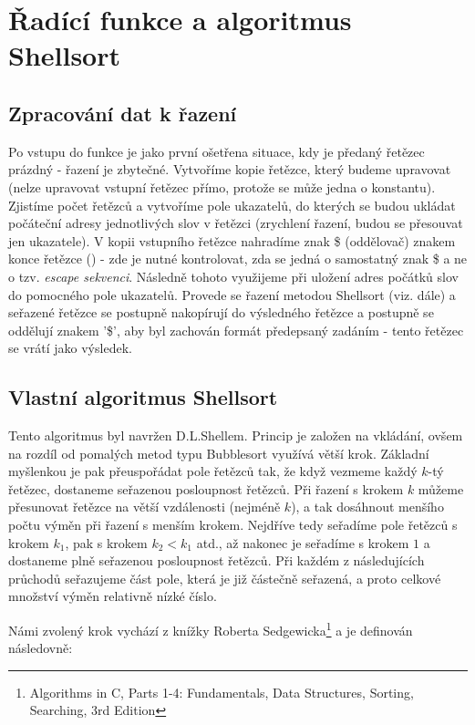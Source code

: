 \section{Řadící funkce a algoritmus Shellsort}

\subsection{Zpracování dat k řazení}
Po vstupu do funkce je jako první ošetřena situace, kdy je předaný řetězec prázdný - řazení je zbytečné.
Vytvoříme kopie řetězce, který budeme upravovat (nelze upravovat vstupní řetězec přímo, protože se může jedna o konstantu).
Zjistíme počet řetězců a vytvoříme pole ukazatelů, do kterých se budou ukládat počáteční adresy jednotlivých slov v řetězci (zrychlení řazení, budou se přesouvat jen ukazatele).
V kopii vstupního řetězce nahradíme znak \$ (oddělovač) znakem konce řetězce () - zde je nutné kontrolovat, zda se jedná o samostatný znak \$ a ne o tzv. \textit{escape sekvenci}.
Následně tohoto využijeme při uložení adres počátků slov do pomocného pole ukazatelů.
Provede se řazení metodou Shellsort (viz. dále) a seřazené řetězce se postupně nakopírují do výsledného řetězce a postupně se oddělují znakem '\$', aby byl zachován formát předepsaný zadáním - tento řetězec se vrátí jako výsledek.

\subsection{Vlastní algoritmus Shellsort}

Tento algoritmus byl navržen D.L.Shellem. Princip je založen na vkládání, ovšem na rozdíl od pomalých metod typu Bubblesort využívá větší krok. Základní myšlenkou je pak přeuspořádat pole řetězců tak, že když vezmeme každý $k$-tý řetězec, dostaneme seřazenou posloupnost řetězců.
Při řazení s krokem $k$ můžeme přesunovat řetězce na větší vzdálenosti (nejméně $k$), a tak dosáhnout menšího počtu výměn při řazení s menším krokem.
Nejdříve tedy seřadíme pole řetězců s krokem $k_{1}$, pak s krokem $k_{2} < k_{1}$ atd., až nakonec je seřadíme s krokem $1$ a dostaneme plně seřazenou posloupnost řetězců. Při každém z následujících průchodů seřazujeme část pole, která je již částečně seřazená, a proto celkové množství výměn relativně nízké číslo.

Námi zvolený krok vychází z knížky Roberta Sedgewicka\footnote{Algorithms in C, Parts 1-4: Fundamentals, Data Structures, Sorting, Searching, 3rd Edition} a je definován následovně:

